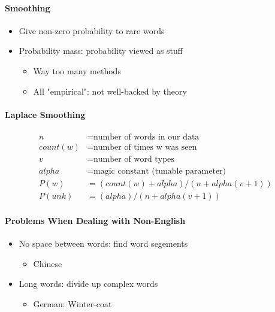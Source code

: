       \paragraph{Smoothing}
      \begin{itemize}
        \item Give non-zero probability to rare words
        \item Probability mass: probability viewed as stuff
        \begin{itemize}
          \item Way too many methods
          \item All "empirical": not well-backed by theory
        \end{itemize}
      \end{itemize}

      \paragraph{Laplace Smoothing}
      \begin{align*}
        n &= \text{number of words in our data} \\
        count(w) &= \text{number of times w was seen} \\
        v &= \text{number of word types} \\
        alpha &= \text{magic constant (tunable parameter)} \\
        P(w) &= (count(w) + alpha) / (n + alpha (v + 1)) \\
        P(unk) &= (alpha) / (n + alpha (v + 1))
      \end{align*}

      \paragraph{Problems When Dealing with Non-English}
      \begin{itemize}
        \item No space between words: find word segements
        \begin{itemize}
          \item Chinese
        \end{itemize}

        \item Long words: divide up complex words
        \begin{itemize}
          \item German: Winter-coat
        \end{itemize}
      \end{itemize}

